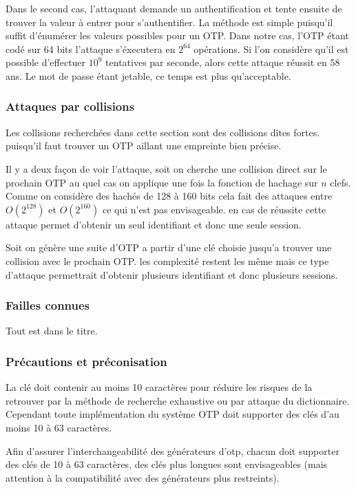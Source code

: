 \documentclass{../res/univ-projet}
\begin{document}
    Dans le second cas, l'attaquant demande un authentification et tente 
    ensuite de trouver la valeur à entrer pour s'authentifier. La méthode est
    simple puisqu'il suffit d'énumérer les valeurs possibles pour un OTP. Dans
    notre cas, l'OTP étant codé sur 64 bits l'attaque s'éxecutera en $2^{64}$ 
    opérations. Si l'on considère qu'il est possible d'effectuer $10^9$ 
    tentatives par seconde, alors cette attaque réussit en 58 ans. Le mot de 
    passe étant jetable, ce temps est plus qu'acceptable.
    
    \subsubsection{Attaques par collisions}
        Les collisions recherchées dans cette section sont des collisions dîtes fortes.
    puisqu'il faut trouver un OTP aillant une empreinte bien précise.
    
        Il y a deux façon de voir l'attaque, soit on cherche une collision direct sur
    le prochain OTP au quel cas on applique une fois la fonction de hachage sur $n$ clefs.
    Comme on considère des hachés de 128 à 160 bits cela fait des attaques entre $O(2^128)$
    et $O(2^160)$ ce qui n'est pas envisageable. en cas de réussite cette attaque permet 
    d'obtenir un seul identifiant et donc une seule session.
    
        Soit on génère une suite d'OTP a partir d'une clé choisie jusqu'a trouver
    une collision avec le prochain OTP. les complexité restent les même mais ce type
    d'attaque permettrait d'obtenir plusieurs identifiant et donc plusieurs sessions.
    
    \subsubsection{Failles connues}
      Tout est dans le titre.
    
    \subsubsection{Précautions et préconisation}
    La clé doit contenir au moins 10 caractères pour réduire les risques de la 
retrouver par la méthode de recherche exhaustive ou par attaque du dictionnaire. 
Cependant toute implémentation du système OTP doit supporter des clés d'au 
moins 10 à 63 caractères.

    Afin d'assurer l'interchangeabilité des générateurs d'otp, chacun doit 
supporter des clés de 10 à 63 caractères, des clés plus longues sont 
envisageables (mais attention à la compatibilité avec des générateurs plus 
restreints).
  
\end{document}
